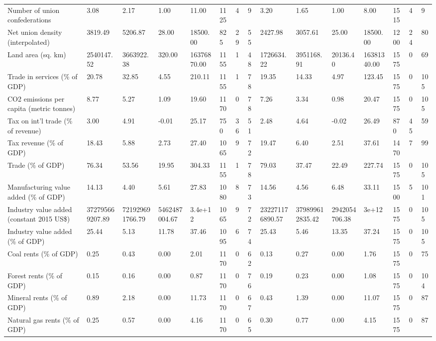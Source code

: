 \begin{longtable}{lllllllllllllll}
Number of union confederations & 3.08 & 2.17 & 1.00 & 11.00 & 1125 & 4 & 9 & 3.20 & 1.65 & 1.00 & 8.00 & 1515 & 4 & 9\\
Net union density (interpolated) & 3819.49 & 5206.87 & 28.00 & 18500.00 & 825 & 29 & 55 & 2427.98 & 3057.61 & 25.00 & 18500.00 & 1200 & 24 & 80\\
Land area (sq. km) & 2540147.52 & 3663922.38 & 320.00 & 16376870.00 & 1155 & 1 & 48 & 1726634.22 & 3951168.91 & 20136.40 & 16381340.00 & 1575 & 0 & 69\\
Trade in services (\% of GDP) & 20.78 & 32.85 & 4.55 & 210.11 & 1155 & 1 & 78 & 19.35 & 14.33 & 4.97 & 123.45 & 1575 & 0 & 105\\
\addlinespace
CO2 emissions per capita (metric tonnes) & 8.77 & 5.27 & 1.09 & 19.60 & 1170 & 0 & 78 & 7.26 & 3.34 & 0.98 & 20.47 & 1575 & 0 & 105\\
Tax on int'l trade (\% of revenue) & 3.00 & 4.91 & -0.01 & 25.17 & 750 & 36 & 51 & 2.48 & 4.64 & -0.02 & 26.49 & 870 & 45 & 59\\
Tax revenue (\% of GDP) & 18.43 & 5.88 & 2.73 & 27.40 & 1065 & 9 & 72 & 19.47 & 6.40 & 2.51 & 37.61 & 1470 & 7 & 99\\
Trade (\% of GDP) & 76.34 & 53.56 & 19.95 & 304.33 & 1155 & 1 & 78 & 79.03 & 37.47 & 22.49 & 227.74 & 1575 & 0 & 105\\
Manufacturing value added (\% of GDP) & 14.13 & 4.40 & 5.61 & 27.83 & 1080 & 8 & 73 & 14.56 & 4.56 & 6.48 & 33.11 & 1500 & 5 & 101\\
\addlinespace
Industry value added (constant 2015 US\$) & 372795669207.89 & 721929691766.79 & 5462487004.67 & 3.4e+12 & 1065 & 9 & 72 & 232271176890.57 & 379899612835.42 & 2942054706.38 & 3e+12 & 1575 & 0 & 105\\
Industry value added (\% of GDP) & 25.44 & 5.13 & 11.78 & 37.46 & 1095 & 6 & 74 & 25.43 & 5.46 & 13.35 & 37.24 & 1575 & 0 & 105\\
Coal rents (\% of GDP) & 0.25 & 0.43 & 0.00 & 2.01 & 1170 & 0 & 62 & 0.13 & 0.27 & 0.00 & 1.76 & 1575 & 0 & 75\\
Forest rents (\% of GDP) & 0.15 & 0.16 & 0.00 & 0.87 & 1170 & 0 & 76 & 0.19 & 0.23 & 0.00 & 1.08 & 1575 & 0 & 104\\
Mineral rents (\% of GDP) & 0.89 & 2.18 & 0.00 & 11.73 & 1170 & 0 & 67 & 0.43 & 1.39 & 0.00 & 11.07 & 1575 & 0 & 87\\
\addlinespace
Natural gas rents (\% of GDP) & 0.25 & 0.57 & 0.00 & 4.16 & 1170 & 0 & 65 & 0.30 & 0.77 & 0.00 & 4.15 & 1575 & 0 & 87\\

\end{longtable}
